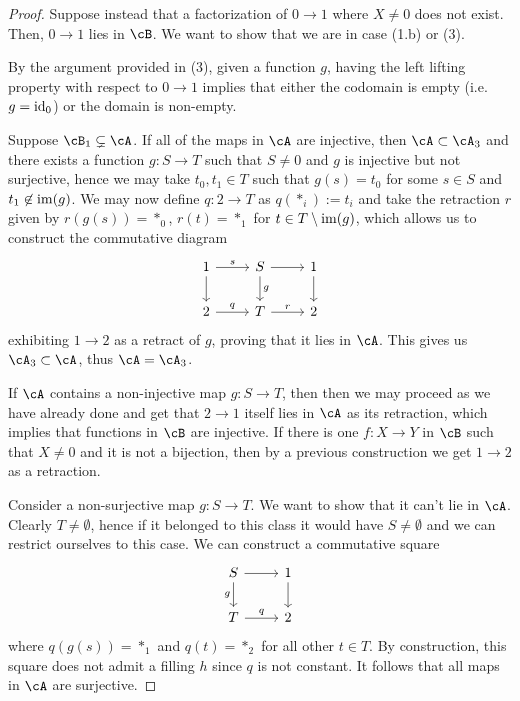 \documentclass[a4paper,11pt,openany]{scrartcl}
\begin{document}
\begin{proof}
    Suppose instead that a factorization of $0\rightarrow 1$ where $X\neq 0$
    does not exist. Then, $0\rightarrow 1$ lies in $\cB$. We want to show that
    we are in case (1.b) or (3).

    By the argument provided in (3), given a function $g$, having the left
    lifting property with respect to $0\rightarrow 1$ implies that either the
    codomain is empty (i.e.\ $g=\operatorname{id}_0$) or the domain is non-empty.

    Suppose $\cB_1\subsetneq\cA$. If all of the maps in $\cA$ are injective,
    then $\cA\subset\cA_3$ and there exists a function $g\colon
    S\rightarrow T$ such that $S\neq 0$ and $g$ is injective but not surjective,
    hence we may take $t_0,t_1\in T$ such that $g(s)=t_0$ for some $s\in S$ and
    $t_1\not\in\operatorname{im}(g)$. We may now define $q\colon 2\rightarrow T$ as
    $q(*_i):=t_i$ and take the retraction $r$ given by $r(g(s))=*_0$, $r(t)=*_1$
    for $t\in T\setminus\operatorname{im}(g)$, which allows us to construct the
    commutative diagram
    \[\begin{tikzcd}
	{1} & {S} & {1} \\
	{2} & {T} & {2}
	\arrow["{s}", from=1-1, to=1-2]
	\arrow[from=1-2, to=1-3]
	\arrow["{q}", from=2-1, to=2-2]
	\arrow["{r}", from=2-2, to=2-3]
	\arrow[from=1-1, to=2-1]
	\arrow["{g}", from=1-2, to=2-2]
	\arrow[from=1-3, to=2-3]
    \end{tikzcd}\]
    exhibiting $1\rightarrow 2$ as a retract of $g$, proving that it lies in
    $\cA$. This gives us $\cA_3\subset\cA$, thus $\cA=\cA_3$.

    If $\cA$ contains a non-injective map $g\colon S\rightarrow T$, then then we
    may proceed as we have already done and get that $2\rightarrow 1$
    itself lies in $\cA$ as its
    retraction, which implies that functions in $\cB$ are injective. If there is
    one $f\colon X\rightarrow Y$ in $\cB$ such that $X\neq 0$ and it is not a
    bijection, then by a previous construction we get $1\rightarrow 2$ as a
    retraction.

    Consider a non-surjective map $g\colon S\rightarrow T$. We want to show that
    it can't lie in $\cA$. Clearly $T\neq\emptyset$, hence if it belonged to
    this class it would have $S\neq\emptyset$ and we can restrict ourselves to
    this case. We can
    construct a commutative square
    \[\begin{tikzcd}
	{S} & {1} \\
	{T} & {2}
	\arrow[from=1-1, to=1-2]
	\arrow["{q}", from=2-1, to=2-2]
	\arrow[from=1-2, to=2-2]
	\arrow["{g}"', from=1-1, to=2-1]
    \end{tikzcd}\]
    where $q(g(s))=*_1$ and $q(t)=*_2$ for all other $t\in T$. By construction,
    this square does not admit a filling $h$ since $q$ is not constant. It
    follows that all maps in $\cA$ are surjective.
\end{proof}
\end{document}
